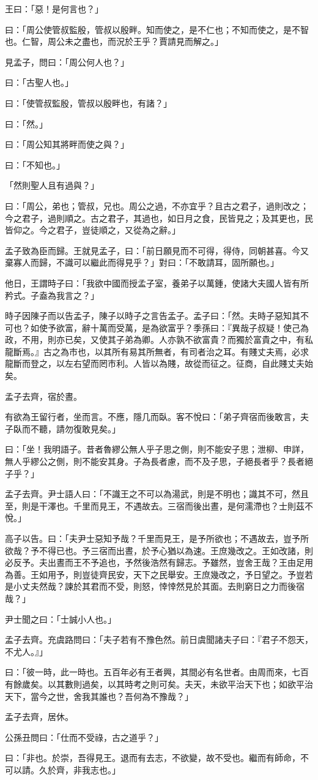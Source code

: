 \begin{pinyinscope}
王曰：「惡！是何言也？」

曰：「周公使管叔監殷，管叔以殷畔。知而使之，是不仁也；不知而使之，是不智也。仁智，周公未之盡也，而況於王乎？賈請見而解之。」

見孟子，問曰：「周公何人也？」

曰：「古聖人也。」

曰：「使管叔監殷，管叔以殷畔也，有諸？」

曰：「然。」

曰：「周公知其將畔而使之與？」

曰：「不知也。」

「然則聖人且有過與？」

曰：「周公，弟也；管叔，兄也。周公之過，不亦宜乎？且古之君子，過則改之；今之君子，過則順之。古之君子，其過也，如日月之食，民皆見之；及其更也，民皆仰之。今之君子，豈徒順之，又從為之辭。」

孟子致為臣而歸。王就見孟子，曰：「前日願見而不可得，得侍，同朝甚喜。今又棄寡人而歸，不識可以繼此而得見乎？」對曰：「不敢請耳，固所願也。」

他日，王謂時子曰：「我欲中國而授孟子室，養弟子以萬鍾，使諸大夫國人皆有所矜式。子盍為我言之？」

時子因陳子而以告孟子，陳子以時子之言告孟子。孟子曰：「然。夫時子惡知其不可也？如使予欲富，辭十萬而受萬，是為欲富乎？季孫曰：『異哉子叔疑！使己為政，不用，則亦已矣，又使其子弟為卿。人亦孰不欲富貴？而獨於富貴之中，有私龍斷焉。』古之為市也，以其所有易其所無者，有司者治之耳。有賤丈夫焉，必求龍斷而登之，以左右望而罔市利。人皆以為賤，故從而征之。征商，自此賤丈夫始矣。

孟子去齊，宿於晝。

有欲為王留行者，坐而言。不應，隱几而臥。客不悅曰：「弟子齊宿而後敢言，夫子臥而不聽，請勿復敢見矣。」

曰：「坐！我明語子。昔者魯繆公無人乎子思之側，則不能安子思；泄柳、申詳，無人乎繆公之側，則不能安其身。子為長者慮，而不及子思，子絕長者乎？長者絕子乎？」

孟子去齊。尹士語人曰：「不識王之不可以為湯武，則是不明也；識其不可，然且至，則是干澤也。千里而見王，不遇故去。三宿而後出晝，是何濡滯也？士則茲不悅。」

高子以告。曰：「夫尹士惡知予哉？千里而見王，是予所欲也；不遇故去，豈予所欲哉？予不得已也。予三宿而出晝，於予心猶以為速。王庶幾改之。王如改諸，則必反予。夫出晝而王不予追也，予然後浩然有歸志。予雖然，豈舍王哉？王由足用為善。王如用予，則豈徒齊民安，天下之民舉安。王庶幾改之，予日望之。予豈若是小丈夫然哉？諫於其君而不受，則怒，悻悻然見於其面。去則窮日之力而後宿哉？」

尹士聞之曰：「士誠小人也。」

孟子去齊。充虞路問曰：「夫子若有不豫色然。前日虞聞諸夫子曰：『君子不怨天，不尤人。』」

曰：「彼一時，此一時也。五百年必有王者興，其間必有名世者。由周而來，七百有餘歲矣。以其數則過矣，以其時考之則可矣。夫天，未欲平治天下也；如欲平治天下，當今之世，舍我其誰也？吾何為不豫哉？」

孟子去齊，居休。

公孫丑問曰：「仕而不受祿，古之道乎？」

曰：「非也。於崇，吾得見王。退而有去志，不欲變，故不受也。繼而有師命，不可以請。久於齊，非我志也。」


\end{pinyinscope}